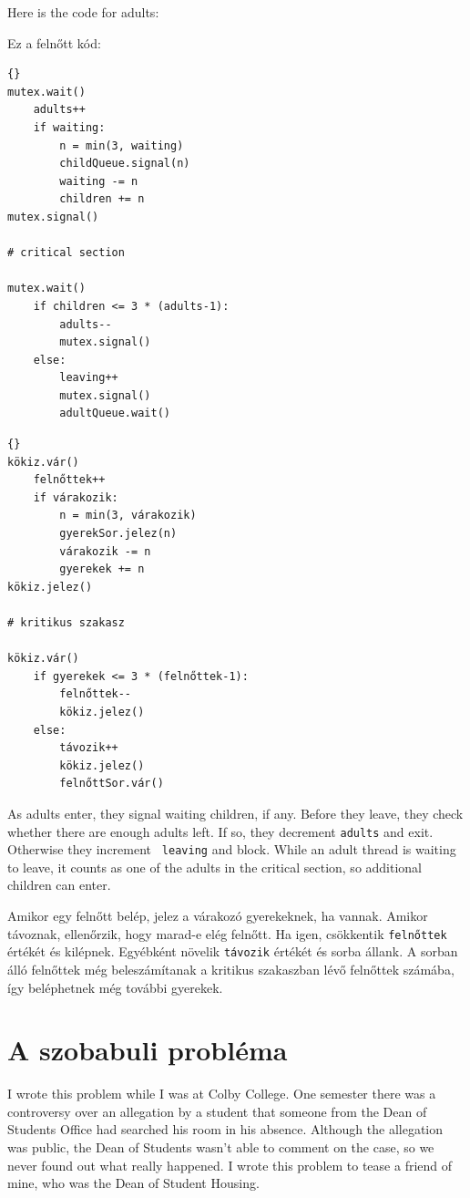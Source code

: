 \documentclass{book}
\begin{document}
\newpage
Here is the code for adults:

Ez a felnőtt kód:

\begin{lstlisting}[title={Extended child care solution (adult)}]{}
mutex.wait()
    adults++
    if waiting:
        n = min(3, waiting)
        childQueue.signal(n)
        waiting -= n
        children += n
mutex.signal()

# critical section

mutex.wait()
    if children <= 3 * (adults-1):
        adults--
        mutex.signal()
    else:
        leaving++
        mutex.signal()
        adultQueue.wait() 
\end{lstlisting}

\begin{lstlisting}[title={Kiterjesztett gyermekmegőrző megoldás (felnőtt)}]{}
kökiz.vár()
    felnőttek++
    if várakozik:
        n = min(3, várakozik)
        gyerekSor.jelez(n)
        várakozik -= n
        gyerekek += n
kökiz.jelez()

# kritikus szakasz

kökiz.vár()
    if gyerekek <= 3 * (felnőttek-1):
        felnőttek--
        kökiz.jelez()
    else:
        távozik++
        kökiz.jelez()
        felnőttSor.vár() 
\end{lstlisting}

As adults enter, they signal waiting children, if any.  Before they
leave, they check whether there are enough adults left.  If so, they
decrement {\tt adults} and exit.  Otherwise they increment {\tt
leaving} and block.  While an adult thread is waiting to leave, it
counts as one of the adults in the critical section, so additional
children can enter.

Amikor egy felnőtt belép, jelez a várakozó gyerekeknek, ha vannak.
Amikor távoznak, ellenőrzik, hogy marad-e elég felnőtt. Ha igen,
csökkentik {\tt felnőttek} értékét és kilépnek. Egyébként
növelik {\tt távozik} értékét és sorba állank. A sorban álló
felnőttek még beleszámítanak a kritikus szakaszban lévő
felnőttek számába, így beléphetnek még további gyerekek.



\newpage
\section{A szobabuli probléma}

I wrote this problem while I was at Colby College.  One semester
there was a controversy over an allegation by a student that someone
from the Dean of Students Office had searched his room in his
absence.  Although the allegation was public, the Dean of Students
wasn't able to comment on the case, so we never found out what
really happened.  I wrote this problem to tease a friend of mine,
who was the Dean of Student Housing.
\end{document}
